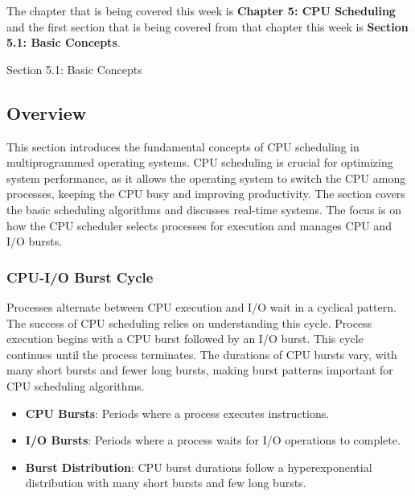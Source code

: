 The chapter that is being covered this week is \textbf{Chapter 5: CPU Scheduling} and the first section that is being covered from that chapter this week is \textbf{Section 5.1: Basic Concepts}.

\begin{notes}{Section 5.1: Basic Concepts}
    \subsection*{Overview}

    This section introduces the fundamental concepts of CPU scheduling in multiprogrammed operating systems. CPU scheduling is crucial for optimizing system performance, as it allows the operating 
    system to switch the CPU among processes, keeping the CPU busy and improving productivity. The section covers the basic scheduling algorithms and discusses real-time systems. The focus is on how 
    the CPU scheduler selects processes for execution and manages CPU and I/O bursts.
    
    \subsubsection*{CPU-I/O Burst Cycle}
    
    Processes alternate between CPU execution and I/O wait in a cyclical pattern. The success of CPU scheduling relies on understanding this cycle. Process execution begins with a CPU burst followed 
    by an I/O burst. This cycle continues until the process terminates. The durations of CPU bursts vary, with many short bursts and fewer long bursts, making burst patterns important for CPU scheduling algorithms.
    
    \begin{highlight}
    
        \begin{itemize}
            \item \textbf{CPU Bursts}: Periods where a process executes instructions.
            \item \textbf{I/O Bursts}: Periods where a process waits for I/O operations to complete.
            \item \textbf{Burst Distribution}: CPU burst durations follow a hyperexponential distribution with many short bursts and few long bursts.
        \end{itemize}
    
    \end{highlight}
    

\end{notes}
